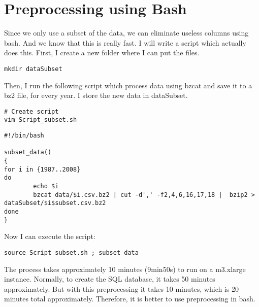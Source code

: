\documentclass{llncs}\usepackage[]{graphicx}\usepackage[]{color}
\begin{document}
\section{Preprocessing using Bash}
Since we only use a subset of the data, we can eliminate useless columns using bash. And we know that this is really fast. I will write a script which actually does this. First, I create a new folder where I can put the files.
\begin{lstlisting}[frame=single] 
mkdir dataSubset
\end{lstlisting}
Then, I run the following script which process data using bzcat and save it to a bz2 file, for every year. I store the new data in dataSubset.
\begin{lstlisting}[frame=single] 
# Create script
vim Script_subset.sh
\end{lstlisting}
\begin{lstlisting}[frame=single] 
#!/bin/bash

subset_data()
{
for i in {1987..2008}
do
        echo $i
        bzcat data/$i.csv.bz2 | cut -d',' -f2,4,6,16,17,18 |  bzip2 > dataSubset/$i$subset.csv.bz2
done
}
\end{lstlisting}
Now I can execute the script:
\begin{lstlisting}[frame=single] 
source Script_subset.sh ; subset_data
\end{lstlisting}
The process takes approximately 10 minutes (9min50s) to run on a m3.xlarge instance. Normally, to create the SQL database, it takes 50 minutes approximately. But with this preprocessing it takes 10 minutes, which is 20 minutes total approximately. Therefore, it is better to use preprocessing in bash.
\end{document}
